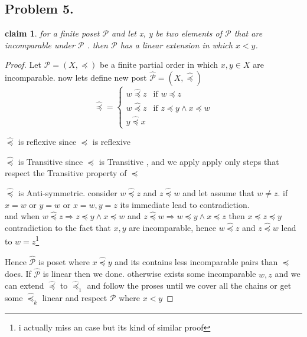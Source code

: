 \documentclass[12pt]{article}
\newtheorem*{claim*}{claim}
\begin{document}
\subsection*{Problem 5.}
\begin{claim*}
for  a finite poset $\mathcal{P}$ and let x, y be two elements of $\mathcal{P}$  that are incomparable under
$\mathcal{P}$ . then $\mathcal{P}$  has a linear extension in which $x < y$.
\end{claim*}
\begin{proof} Let $\mathcal{P}=(X,\preceq)$ be a finite partial order in which $x, y\in X$ are incomparable. now lets define new post $\hat{\mathcal{P}}=(X,\hat{\preceq})$  
\[
  \hat{\preceq} =
  \begin{cases}
   w\hat{\preceq}z &\text{if } w\preceq z  \\
   w\hat{\preceq}z &\text{if } z\preceq y\wedge x\preceq w \\
                           y \hat{\preceq} x        
  \end{cases}
\]
\begin{list}{•}{}
\item $\hat{\preceq}$ is reflexive since $\preceq$ is reflexive
\item $\hat{\preceq}$ is Transitive since $\preceq$ is Transitive , and we apply apply only steps that respect the Transitive property of   $\preceq$
\item $\hat{\preceq}$ is Anti-symmetric. consider $w\hat{\preceq}z$ and $z\hat{\preceq}w$  and let assume that $w\neq z$. if $x=w$ or $y=w$ or $x=w,y=z$ its immediate lead to  contradiction.\\ 
and when $w\hat{\preceq}z \Rightarrow z\preceq y\wedge x\preceq w$ and $z\hat{\preceq}w \Rightarrow w\preceq y\wedge x\preceq z$  then $x\preceq z \preceq y $ contradiction to the fact that $x,y$ are incomparable, hence $w\hat{\preceq}z$ and $z\hat{\preceq}w$ lead to $w=z$\footnote{i actually miss an case but its kind of similar proof}
\end{list}
Hence $\hat{\mathcal{P}}$ is poset where $x\hat{\preceq} y$ and its contains less incomparable pairs than $\preceq$ does. If $\hat{\mathcal{P}}$ is linear then we done. otherwise exists some incomparable  $w,z$ and we can extend $\hat{\preceq}$ to $\hat{\preceq}_1$ and follow the proses until we cover all the chains or get  some $\hat{\preceq}_k $ linear and respect $\mathcal{P}$ where $x<y$
\end{proof}
\end{document}
